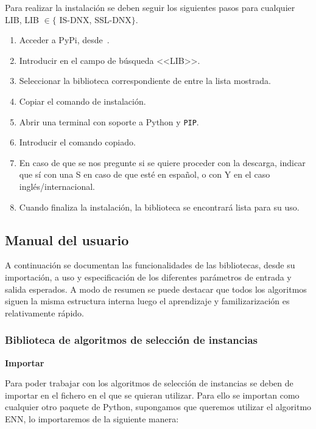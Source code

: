 Para realizar la instalación se deben seguir los siguientes pasos para cualquier LIB, LIB $\in \lbrace$ IS-DNX, SSL-DNX$\rbrace$.

\begin{enumerate}
\item Acceder a PyPi, desde~\cite{PyPI}.
\item Introducir en el campo de búsqueda <<LIB>>.
\item Seleccionar la biblioteca correspondiente de entre la lista mostrada.
\item Copiar el comando de instalación.
\item Abrir una terminal con soporte a Python y \texttt{PIP}.
\item Introducir el comando copiado.
\item En caso de que se nos pregunte si se quiere proceder con la descarga, indicar que sí con una S en caso de que esté en español, o con Y en el caso inglés/internacional.
\item Cuando finaliza la instalación, la biblioteca se encontrará lista para su uso.
\end{enumerate}



\subsection{Manual del usuario}

A continuación se documentan las funcionalidades de las bibliotecas, desde su importación, a uso y especificación de los diferentes parámetros de entrada y salida esperados. A modo de resumen se puede destacar que todos los algoritmos siguen la misma estructura interna luego el aprendizaje y familizarización es relativamente rápido.

\subsubsection{Biblioteca de algoritmos de selección de instancias}
\textbf{Importar}

Para poder trabajar con los algoritmos de selección de instancias se deben de importar en el fichero en el que se quieran utilizar. Para ello se importan como cualquier otro paquete de Python, supongamos que queremos utilizar el algoritmo ENN, lo importaremos de la siguiente manera:

